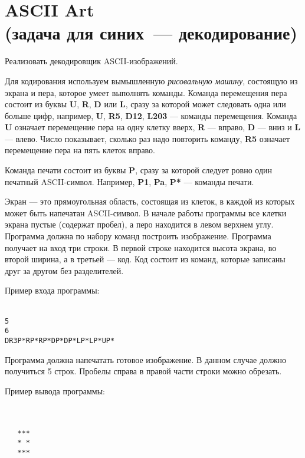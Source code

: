 \documentclass[a4paper,10pt]{article}
\begin{document}
\section*{ASCII Art\\
(задача для синих~--- декодирование)}

Реализовать декодировщик ASCII-изображений.

Для кодирования используем вымышленную {\em рисовальную машину}, состоящую из экрана и пера, которое умеет выполнять команды.
Команда перемещения пера состоит из буквы \textbf{U}, \textbf{R}, \textbf{D} или \textbf{L}, сразу за которой может следовать одна или больше цифр, например, \textbf{U}, \textbf{R5}, \textbf{D12}, \textbf{L203} — команды перемещения.
Команда \textbf{U} означает перемещение пера на одну клетку вверх, \textbf{R} — вправо, \textbf{D} — вниз и \textbf{L} — влево.
Число показывает, сколько раз надо повторить команду, \textbf{R5} означает перемещение пера на пять клеток вправо.

Команда печати состоит из буквы \textbf{P}, сразу за которой следует ровно один печатный ASCII-символ.
Например, \textbf{P1}, \textbf{Pa}, \textbf{P*} — команды печати.

Экран — это прямоугольная область, состоящая из клеток, в каждой из которых может быть напечатан ASCII-символ.
В начале работы программы все клетки экрана пустые (содержат пробел), а перо находится в левом верхнем углу.
Программа должна по набору команд построить изображение.
Программа получает на вход три строки.
В первой строке находится высота экрана, во второй ширина, а в третьей — код.
Код состоит из команд, которые записаны друг за другом без разделителей.

Пример входа программы:

\texttt{ \\
5\\
6\\
DR3P*RP*RP*DP*DP*LP*LP*UP*}

Программа должна напечатать готовое изображение.
В данном случае должно получиться 5 строк.
Пробелы справа в правой части строки можно обрезать.

Пример вывода программы:


\texttt{ \\
\\
\ \ \ ***\\
\ \ \ *\ *\\
\ \ \ ***\\
\\
}
\end{document}
